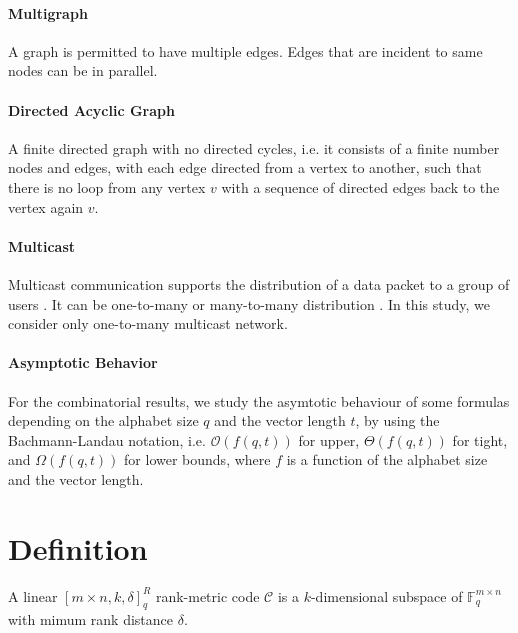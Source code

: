 \paragraph{Multigraph}

A graph is permitted to have multiple edges. Edges that are incident
to same nodes can be in parallel. 

\paragraph{Directed Acyclic Graph}

A finite directed graph with no directed cycles, i.e. it consists
of a finite number nodes and edges, with each edge directed from a
vertex to another, such that there is no loop from any vertex $v$
with a sequence of directed edges back to the vertex again $v$.

\paragraph{Multicast}

Multicast communication supports the distribution of a data packet
to a group of users \cite{Zhang:2012}. It can be one-to-many or many-to-many
distribution \cite{Harte:2008}. In this study, we consider only one-to-many
multicast network.

\paragraph{Asymptotic Behavior}

For the combinatorial results, we study the asymtotic behaviour of
some formulas depending on the alphabet size $q$ and the vector length
$t$, by using the Bachmann-Landau notation, i.e. $\mathcal{O}\left(f\left(q,t\right)\right)$
for upper, $\Theta\left(f\left(q,t\right)\right)$ for tight, and
$\Omega\left(f\left(q,t\right)\right)$ for lower bounds, where $f$
is a function of the alphabet size and the vector length.

\section{Definition}
\begin{defn}
 A linear $\left[m\times n,k,\delta\right]_{q}^{R}$ rank-metric
code $\mathcal{C}$ is a $k$-dimensional subspace of $\ensuremath{\mathbb{F}}_{q}^{m\times n}$
with mimum rank distance $\delta$.
\end{defn}

